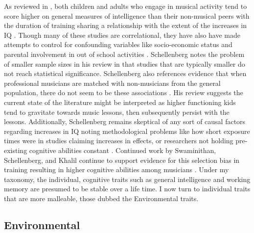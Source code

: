 \documentclass[12pt,]{book}
\begin{document}
As reviewed in \citet{schellenbergMusicNonmusicalAbilities2017}, both children and adults who engage in musical activity tend to score higher on general measures of intelligence than their non-musical peers \citep{gibsonEnhancedDivergentThinking2009, hilleAssociationsMusicEducation2011, schellenbergExaminingAssociationMusic2011, schellenbergMusicTrainingEmotion2012} with the duration of training sharing a relationship with the extent of the increases in IQ \citep{corrigallPredictingWhoTakes2015, degeMusicLessonsIntelligence2011, schellenbergLongtermPositiveAssociations2006}.
Though many of these studies are correlational, they have also have made attempts to control for confounding variables like socio-economic status and parental involvement in out of school activities \citep{corrigallAssociationsLengthMusic2011, degeMusicLessonsIntelligence2011, schellenbergExaminingAssociationMusic2011, schellenbergMusicTrainingEmotion2012}.
Schellenberg notes the problem of smaller sample sizes in his review \citep{corrigallAssociationsLengthMusic2011, parbery-clarkMusicalExperienceAging2011, straitMusicalTrainingEarly2012} in that studies that are typically smaller do not reach statistical significance.
Schellenberg also references evidence that when professional musicians are matched with non-musicians from the general population, there do not seem to be these associations \citep{schellenbergLongtermPositiveAssociations2006}.
His review suggests the current state of the literature might be interpreted as higher functioning kids tend to gravitate towards music lessons, then subsequently persist with the lessons.
Additionally, Schellenberg remains skeptical of any sort of causal factors regarding increases in IQ \citep{francoisMusicTrainingDevelopment2013, morenoMusicalTrainingInfluences2009} noting methodological problems like how short exposure times were in studies claiming increases in effects, or researchers not holding pre-existing cognitive abilities constant \citep{mehrTwoRandomizedTrials2013}.
Continued work by Swaminithan, Schellenberg, and Khalil continue to support evidence for this selection bias in training resulting in higher cognitive abilities among musicians \citep{swaminathanRevisitingAssociationMusic2017}.
Under my taxonomy, the individual, cognitive traits such as general intelligence and working memory are presumed to be stable over a life time.
I now turn to individual traits that are more malleable, those dubbed the Environmental traits.

\hypertarget{environmental}{%
\subsection{Environmental}\label{environmental}}
\end{document}
